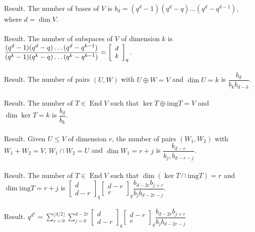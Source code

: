 \documentclass[english]{article}
\def\disp{\displaystyle}
\newcommand\floor[1]{\lfloor{#1}\rfloor}
\def\img{\text{img}}
\DeclareMathOperator\End{End}
\begin{document}
Result. The number of bases of $V$ is $b_d=(q^d-1)(q^d-q)\dots (q^d-q^{d-1})$, where $d=\dim V$.\\\\


Result. The number of subspaces of $V$ of dimension $k$ is $\dfrac{(q^d-1)(q^d-q)\dots (q^d-q^{k-1})}{(q^k-1)(q^k-q)\dots (q^k-q^{k-1})}=\small{\left[\begin{array}{c}
d\\
k
\end{array}\right]}_{q}$.\\\\


Result. The number of pairs $(U,W)$ with $U\oplus W=V$ and $\dim U=k$ is $\dfrac{b_d}{b_k b_{d-k}}$.\\\\


Result. The number of $T\in\End V$ such that $\ker T\oplus \img T =V$ and $\dim\ker T=k$ is $\dfrac{b_d}{b_k}$.\\\\


Result. Given $U\le V$ of dimension $r$, the number of pairs $(W_1,W_2)$ with $W_1\plus W_2=V$, $W_1\cap W_2=U$ and $\dim W_1=r+j$ is $\dfrac{b_{d-r}}{b_j, b_{d-r-j}}$.\\\\


Result. The number of $T\in\End V$ such that $\dim (\ker T\cap \img T)=r$ and $\dim \img T=r+j$ is $\left[\begin{array}{c}
d\\
d-r
\end{array}\right]_{q}\left[\begin{array}{c}
d-r\\
r
\end{array}\right]_{q}\dfrac{b_{d-2r}b_{j+r}}{b_{j}b_{d-2r-j}}$.\\\\


Result. $q^{d^2}=\disp \sum_{r=0}^{\floor{d/2}}\sum_{j=0}^{d-2r}\left[\begin{array}{c}
d\\
d-r
\end{array}\right]_{q}\left[\begin{array}{c}
d-r\\
r
\end{array}\right]_{q}\dfrac{b_{d-2r}b_{j+r}}{b_{j}b_{d-2r-j}}$\\\\
\end{document}
